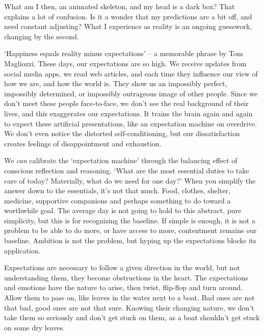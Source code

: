 What am I then, an animated skeleton, and my head is a dark box? That
explains a lot of confusion. Is it a wonder that my predictions are a
bit off, and need constant adjusting? What I experience as reality is an
ongoing guesswork, changing by the second.

`Happiness equals reality minus expectations' -- a memorable phrase by
Tom Magliozzi. These days, our expectations are so high. We receive
updates from social media apps, we read web articles, and each time they
influence our view of how we are, and how the world is. They show us an
impossibly perfect, impossibly determined, or impossibly outrageous
image of other people. Since we don't meet these people face-to-face, we
don't see the real background of their lives, and this exaggerates our
expectations. It trains the brain again and again to expect these
artificial presentations, like an expectation machine on overdrive. We
don't even notice the distorted self-conditioning, but our
dissatisfaction creates feelings of disappointment and exhaustion.


We \emph{can} calibrate the `expectation machine' through the balancing
effect of conscious reflection and reasoning. `What are the most
essential duties to take care of today? Materially, what do we need for
one day?' When you simplify the answer down to the essentials, it's not
that much. Food, clothes, shelter, medicine, supportive companions and
perhaps something to do toward a worthwhile goal. The average day is not
going to hold to this abstract, pure simplicity, but this is for
recognizing the baseline. If simple is enough, it is not a problem to be
able to do more, or have access to more, contentment remains our
baseline. Ambition is not the problem, but hyping up the expectations
blocks its application.

Expectations are necessary to follow a given direction in the world, but
not understanding them, they become obstructions in the heart. The
expectations and emotions have the nature to arise, then twist,
flip-flop and turn around. Allow them to pass on, like leaves in the
water next to a boat. Bad ones are not that bad, good ones are not that
sure. Knowing their changing nature, we don't take them so seriously and
don't get stuck on them, as a boat shouldn't get stuck on some dry
leaves.

